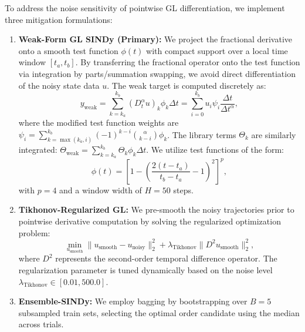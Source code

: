 \documentclass[review,3p,times]{elsarticle}
\begin{document}
To address the noise sensitivity of pointwise GL differentiation, we implement three mitigation formulations:
\begin{enumerate}
  \item \textbf{Weak-Form GL SINDy (Primary):} We project the fractional derivative onto a smooth test function $\phi(t)$ with compact support over a local time window $[t_a, t_b]$. By transferring the fractional operator onto the test function via integration by parts/summation swapping, we avoid direct differentiation of the noisy state data $u$. The weak target is computed discretely as:
  \begin{equation}
  y_{\text{weak}} = \sum_{k=k_a}^{k_b} (D^\alpha_t u)_k \phi_k \Delta t = \sum_{i=0}^{k_b} u_i \psi_i \frac{\Delta t}{\Delta t^\alpha},
  \end{equation}
  where the modified test function weights are $\psi_i = \sum_{k=\max(k_a, i)}^{k_b} (-1)^{k-i} \binom{\alpha}{k-i} \phi_k$. The library terms $\Theta_k$ are similarly integrated: $\Theta_{\text{weak}} = \sum_{k=k_a}^{k_b} \Theta_k \phi_k \Delta t$. We utilize test functions of the form:
  \begin{equation}
  \phi(t) = \left[ 1 - \left( \frac{2(t - t_a)}{t_b - t_a} - 1 \right)^2 \right]^p,
  \end{equation}
  with $p = 4$ and a window width of $H = 50$ steps.
  \item \textbf{Tikhonov-Regularized GL:} We pre-smooth the noisy trajectories prior to pointwise derivative computation by solving the regularized optimization problem:
  \begin{equation}
  \min_{u_{\text{smooth}}} \| u_{\text{smooth}} - u_{\text{noisy}} \|_2^2 + \lambda_{\text{Tikhonov}} \| D^2 u_{\text{smooth}} \|_2^2,
  \end{equation}
  where $D^2$ represents the second-order temporal difference operator. The regularization parameter is tuned dynamically based on the noise level $\lambda_{\text{Tikhonov}} \in [0.01, 500.0]$.
  \item \textbf{Ensemble-SINDy:} We employ bagging by bootstrapping over $B=5$ subsampled train sets, selecting the optimal order candidate using the median across trials.
\end{enumerate}
\end{document}
